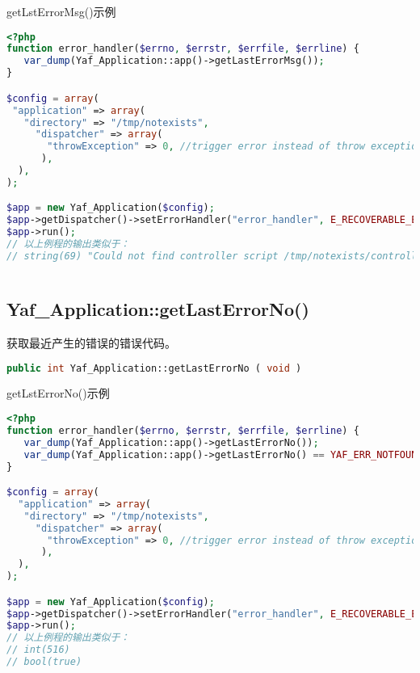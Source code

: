 \begin{example}
getLstErrorMsg()示例
\begin{lstlisting}[language=PHP]
<?php
function error_handler($errno, $errstr, $errfile, $errline) {
   var_dump(Yaf_Application::app()->getLastErrorMsg());
}

$config = array(                   
 "application" => array(
   "directory" => "/tmp/notexists",
     "dispatcher" => array(
       "throwException" => 0, //trigger error instead of throw exception when error occure
      ),
  ),
);

$app = new Yaf_Application($config);
$app->getDispatcher()->setErrorHandler("error_handler", E_RECOVERABLE_ERROR);
$app->run();
// 以上例程的输出类似于：
// string(69) "Could not find controller script /tmp/notexists/controllers/Index.php"
\end{lstlisting}
\end{example}


\begin{lstlisting}[language=PHP]

\end{lstlisting}


\subsection{Yaf\_Application::getLastErrorNo()}

获取最近产生的错误的错误代码。






\begin{lstlisting}[language=PHP]
public int Yaf_Application::getLastErrorNo ( void )
\end{lstlisting}


\begin{example}
getLstErrorNo()示例
\begin{lstlisting}[language=PHP]
<?php
function error_handler($errno, $errstr, $errfile, $errline) {
   var_dump(Yaf_Application::app()->getLastErrorNo());
   var_dump(Yaf_Application::app()->getLastErrorNo() == YAF_ERR_NOTFOUND_CONTROLLER);
}

$config = array(
  "application" => array(
   "directory" => "/tmp/notexists",
     "dispatcher" => array(
       "throwException" => 0, //trigger error instead of throw exception when error occure
      ),
  ),
);

$app = new Yaf_Application($config);
$app->getDispatcher()->setErrorHandler("error_handler", E_RECOVERABLE_ERROR);
$app->run();
// 以上例程的输出类似于：
// int(516)
// bool(true)
\end{lstlisting}
\end{example}





